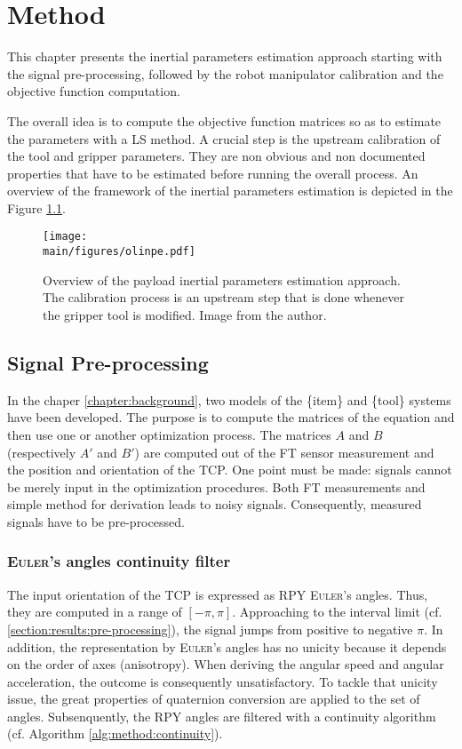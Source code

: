 \documentclass[/home/francois/latex/report/main.tex]{subfiles}
\begin{document}
\chapter{Method}
\label{chapter:method}

This chapter presents the inertial parameters estimation approach starting with the signal pre-processing, followed by the robot manipulator calibration and the objective function computation.

The overall idea is to compute the objective function matrices so as to estimate the parameters with a \ac{LS} method. A crucial step is the upstream calibration of the tool and gripper parameters. They are non obvious and non documented properties that have to be estimated before running the overall process. An overview of the framework of the inertial parameters estimation is depicted in the Figure \ref{fig:method:overall}.

\begin{figure}[h]
  \centering
  \texttt{[image: \\main/figures/olinpe.pdf]}
  \caption{Overview of the payload inertial parameters estimation approach. The calibration process is an upstream step that is done whenever the gripper tool is modified. Image from  the author.}
  \label{fig:method:overall}
\end{figure}

\section{Signal Pre-processing}
\label{section:pre-pro}

In the chaper \ref{chapter:background}, two models of the \{item\} and \{tool\} systems have been developed. The purpose is to compute the matrices of the equation and then use one or another optimization process. The matrices $A$ and $B$ (respectively $A'$ and $B'$) are computed out of the \ac{FT} sensor measurement and the position and orientation of the \ac{TCP}. One point must be made: signals cannot be merely input in the optimization procedures. Both \ac{FT} measurements and simple method for derivation leads to noisy signals. Consequently, measured signals have to be pre-processed.

\subsection{\textsc{Euler}'s angles continuity filter}
\label{subsection:method:euler-filter}

The input orientation of the \ac{TCP} is expressed as \ac{RPY} \textsc{Euler}'s angles. Thus, they are computed in a range of $[-\pi, \pi]$. Approaching to the interval limit (cf. \ref{section:results:pre-processing}), the signal jumps from positive to negative $\pi$. In addition, the representation by \textsc{Euler}'s angles has no unicity because it depends on the order of axes (anisotropy). When deriving the angular speed and angular acceleration, the outcome is consequently unsatisfactory. To tackle that unicity issue, the great properties of quaternion conversion are applied to the set of angles. Subsenquently, the \ac{RPY} angles are filtered with a continuity algorithm (cf. Algorithm \ref{alg:method:continuity}).
\end{document}
